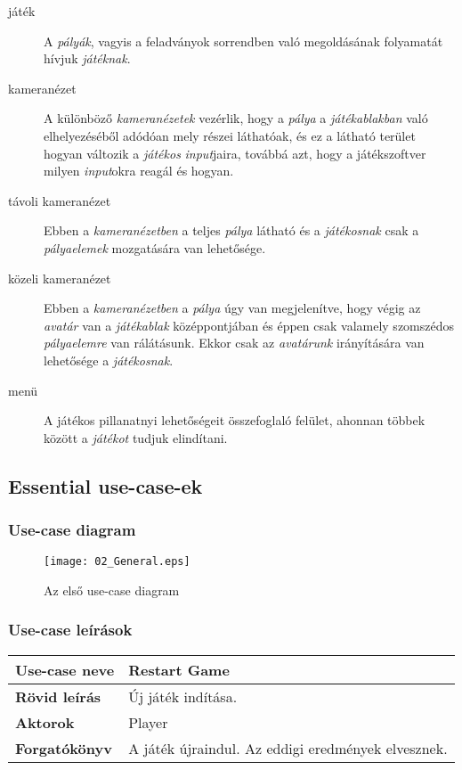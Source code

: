 \begin{description}
\item[játék]
A \emph{pályák}, vagyis a feladványok sorrendben való megoldásának folyamatát hívjuk \emph{játéknak}.



\item[kameranézet]
A különböző \emph{kameranézetek} vezérlik, hogy a \emph{pálya} a \emph{játékablakban} való elhelyezéséből adódóan mely részei láthatóak, és ez a látható terület hogyan változik a \emph{játékos} \emph{input}jaira, továbbá azt, hogy a játékszoftver milyen \emph{input}okra reagál és hogyan.

\item[távoli kameranézet]
Ebben a \emph{kameranézetben} a teljes \emph{pálya} látható és a \emph{játékosnak} csak a \emph{pályaelemek} mozgatására van lehetősége.

\item[közeli kameranézet]
Ebben a \emph{kameranézetben} a \emph{pálya} úgy van megjelenítve, hogy végig az \emph{avatár} van a \emph{játékablak} középpontjában és éppen csak valamely szomszédos \emph{pályaelemre} van rálátásunk. Ekkor csak az \emph{avatárunk} irányítására van lehetősége a \emph{játékosnak}.



\item[menü]
A játékos pillanatnyi lehetőségeit összefoglaló felület, ahonnan többek között a \emph{játékot} tudjuk elindítani.

\end{description}

\subsection{Essential use-case-ek}

\subsubsection{Use-case diagram}
\begin{figure}[htb]
\centering
\texttt{[image: 02\_General.eps]}
\caption{Az első use-case diagram}
\label{fig:02general}
\end{figure}

\subsubsection{Use-case leírások}
\begin{center}
\begin{tabular}{|l|p{320pt}|}
\hline 
\textbf{Use-case neve} & Restart Game \\ 
\hline \hline
\textbf{Rövid leírás} & Új játék indítása. \\ 
\hline 
\textbf{Aktorok} & Player \\ 
\hline 
\textbf{Forgatókönyv} & A játék újraindul. Az eddigi eredmények elvesznek. \\ 
\hline
\end{tabular}
\end{center}

